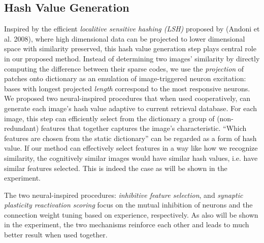 \documentclass[letterpaper]{article}
\begin{document}
\subsection{Hash Value Generation}
Inspired by the efficient \emph{localitive sensitive hashing (LSH)} proposed by (Andoni et al. 2008), where high dimensional data can be projected to lower dimensional space with similarity preserved, this hash value generation step plays central role in our proposed method.
Instead of determining two images' similarity by directly computing the difference between their sparse codes, we use the \emph{projection} of patches onto dictionary as an emulation of image-triggered neuron excitation: bases with longest projected \emph{length} correspond to the most responsive neurons. We proposed two neural-inspired procedures that when used cooperatively, can generate each image's hash value adaptive to current retrieval database. For each image, this step can efficiently select from the dictionary a group of (non-redundant) features that together captures the image's characteristic. ``Which features are chosen from the static dictionary'' can be regarded as a form of hash value. If our method can effectively select features in a way like how we recognize similarity, the cognitively similar images would have similar hash values, i.e. have similar features selected. This is indeed the case as will be shown in the experiment.

The two neural-inspired procedures: \emph{inhibitive feature selection}, and \emph{synaptic plasticity reactivation scoring} focus on the mutual inhibition of neurons and the connection weight tuning based on experience, respectively. As also will be shown in the experiment, the two mechanisms reinforce each other and leads to much better result when used together.
\end{document}
